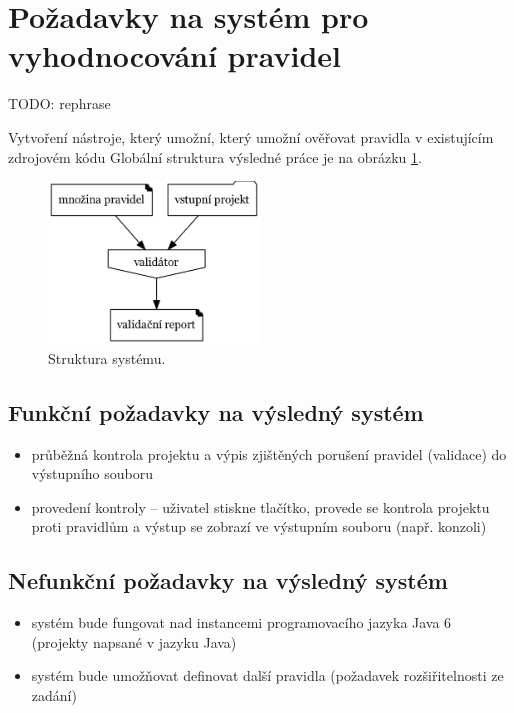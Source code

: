 \section{Požadavky na systém pro vyhodnocování pravidel}

TODO: rephrase

Vytvoření nástroje, který umožní, který umožní ověřovat pravidla v existujícím zdrojovém kódu
Globální struktura výsledné práce je na obrázku \ref{requirements-system_structure}.

\begin{figure}[h!]
  \centering
  \includegraphics[width=0.5\textwidth]{./graphs/global_structure.png}
  \caption{Struktura systému.\label{requirements-system_structure}}
\end{figure}

\subsection{Funkční požadavky na výsledný systém}
\begin{itemize}
\item průběžná kontrola projektu a výpis zjištěných porušení pravidel (validace) do výstupního souboru
\item provedení kontroly  -- uživatel stiskne tlačítko, provede se kontrola projektu proti pravidlům a výstup se zobrazí ve výstupním souboru (např. konzoli)
\end{itemize}

\subsection{Nefunkční požadavky na výsledný systém}
\begin{itemize}
\item systém bude fungovat nad instancemi programovacího jazyka Java 6 (projekty napsané v jazyku Java)
\item systém bude umožňovat definovat další pravidla (požadavek rozšiřitelnosti ze zadání)
\end{itemize}

